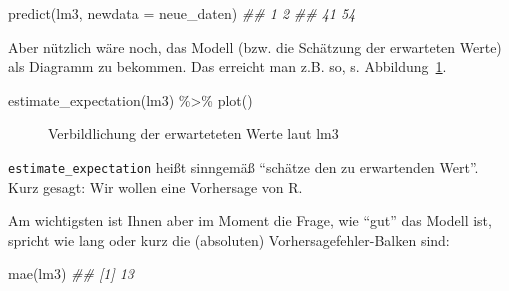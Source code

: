 \documentclass[
  letterpaper,
  twoside,
  open=any]{scrbook}
\newenvironment{Shaded}{\begin{snugshade}}{\end{snugshade}}
\newcommand{\AttributeTok}[1]{\textcolor[rgb]{0.40,0.45,0.13}{#1}}
\newcommand{\DocumentationTok}[1]{\textcolor[rgb]{0.37,0.37,0.37}{\textit{#1}}}
\newcommand{\FunctionTok}[1]{\textcolor[rgb]{0.28,0.35,0.67}{#1}}
\newcommand{\NormalTok}[1]{\textcolor[rgb]{0.00,0.23,0.31}{#1}}
\newcommand{\SpecialCharTok}[1]{\textcolor[rgb]{0.37,0.37,0.37}{#1}}
\theoremstyle{definition}
\theoremstyle{definition}
\theoremstyle{definition}
\theoremstyle{remark}
\begin{document}
\begin{Shaded}
\begin{Highlighting}[]
\FunctionTok{predict}\NormalTok{(lm3, }\AttributeTok{newdata =}\NormalTok{ neue\_daten)}
\DocumentationTok{\#\#  1  2 }
\DocumentationTok{\#\# 41 54}
\end{Highlighting}
\end{Shaded}

Aber nützlich wäre noch, das Modell (bzw. die Schätzung der erwarteten
Werte) als Diagramm zu bekommen. Das erreicht man z.B. so, s.
Abbildung~\ref{fig-lm3}.

\begin{Shaded}
\begin{Highlighting}[]
\FunctionTok{estimate\_expectation}\NormalTok{(lm3) }\SpecialCharTok{\%\textgreater{}\%} \FunctionTok{plot}\NormalTok{()}
\end{Highlighting}
\end{Shaded}

\begin{figure}[H]


\caption{\label{fig-lm3}Verbildlichung der erwarteteten Werte laut lm3}

\end{figure}%

\texttt{estimate\_expectation} heißt sinngemäß \enquote{schätze den zu
erwartenden Wert}. Kurz gesagt: Wir wollen eine Vorhersage von R.

Am wichtigsten ist Ihnen aber im Moment die Frage, wie \enquote{gut} das
Modell ist, spricht wie lang oder kurz die (absoluten)
Vorhersagefehler-Balken sind:

\begin{Shaded}
\begin{Highlighting}[]
\FunctionTok{mae}\NormalTok{(lm3)}
\DocumentationTok{\#\# [1] 13}
\end{Highlighting}
\end{Shaded}
\end{document}
